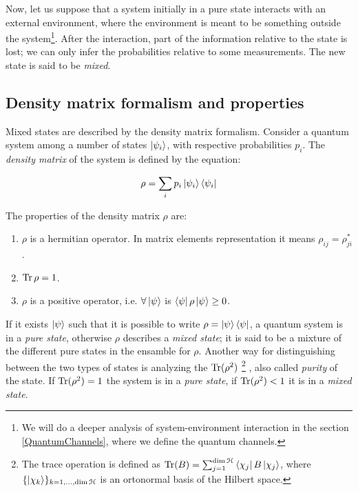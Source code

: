 \noindent Now, let us suppose that a system initially in a pure state interacts with an external environment, where the environment is meant to be something outside the system\footnote{We will do a deeper analysis of system-environment interaction in the section \ref{QuantumChannels}, where we define the quantum channels.}. After the interaction, part of the information relative to the state is lost; we can only infer the probabilities relative to some measurements. The new state is said to be \textit{mixed}.

\subsection{Density matrix formalism and properties}
Mixed states are described by the density matrix formalism. Consider a quantum system among a number of states $\left| \psi_i \right \rangle$, with respective probabilities $p_i$. The \textit{density matrix} of the system is defined by the equation:

\begin{equation}
 \rho = \sum_i p_i \left| \psi_i \right \rangle\left\langle \psi_i \right | 
 \label{8_firstchapter}
 \end{equation}
 
\noindent
The properties of the density matrix $\rho$ are:

\begin{enumerate}

\item $\rho$ is a hermitian operator. In matrix elements representation it means $\rho_{ij}=\rho_{ji}^*$.
\item $\operatorname{Tr} \rho = 1$.
\item $\rho$ is a positive operator, i.e. $\forall  \left| \psi \right \rangle$ is $\left\langle \psi \right | \rho \left| \psi \right \rangle \geq 0 $.

\end{enumerate}

\noindent If it exists $\left| \psi \right \rangle$ such that it is possible to write $\rho= \left| \psi \right \rangle\left\langle \psi \right |$, a quantum system is in a \textit{pure state}, otherwise $\rho$ describes a \textit{mixed state}; it is said to be a mixture of the different pure states in the ensamble for $\rho$. 
Another way for distinguishing between the two types of states is analyzing the $\operatorname{Tr} (\rho^2)$ \footnote{The trace operation is defined as $\operatorname{Tr} (B) = \sum_{j=1}^{\text{dim}\, \mathcal{H}} \left\langle \chi_j \right |B \left| \chi_j \right \rangle$, where $\{ \left| \chi_k \right \rangle \}_{k=1,\dots,\text{dim}\, \mathcal{H}}$ is an ortonormal basis of the Hilbert space.} , also called \textit{purity} of the state. If $\operatorname{Tr} (\rho^2) = 1$ the system is in a \textit{pure state}, if $\operatorname{Tr} (\rho^2) < 1$ it is in a \textit{mixed state}.

